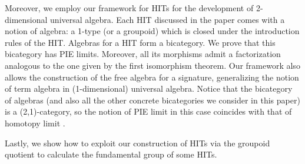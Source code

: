 Moreover, we employ our framework for HITs for the development of
2-dimensional universal algebra. Each HIT discussed in the paper comes
with a notion of algebra: a 1-type (or a groupoid) which is closed
under the introduction rules of the HIT.  Algebras for a HIT form a
bicategory. We prove that this bicategory has PIE limits. Moreover,
all its morphisms admit a factorization analogous to the one given by the
first isomorphism theorem. Our framework also allows the construction
of the free algebra for a signature, generalizing the notion of term
algebra in (1-dimensional) universal algebra. Notice that the bicategory of algebras (and also all the other concrete bicategories we consider in this paper) is a (2,1)-category, so the notion of PIE limit in this case coincides with that of homotopy limit \cite{AvigadKL15}.

Lastly, we show how to exploit our construction of HITs via the
groupoid quotient to calculate the fundamental group of some HITs.

